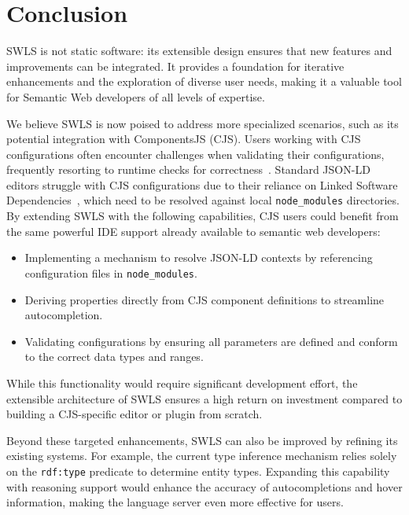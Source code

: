 \section{Conclusion}%
\label{sec:conclusion}

SWLS is not static software: its extensible design ensures that new features and improvements can be integrated.
It provides a foundation for iterative enhancements and the exploration of diverse user needs, making it a valuable tool for Semantic Web developers of all levels of expertise.

We believe SWLS is now poised to address more specialized scenarios, such as its potential integration with ComponentsJS (CJS).
Users working with CJS configurations often encounter challenges when validating their configurations, frequently resorting to runtime checks for correctness~\cite{01GPAWNQ5ZS2DAY0J9JMPQHM9C}.
Standard JSON-LD editors struggle with CJS configurations due to their reliance on Linked Software Dependencies~\cite{CJS2}, which need to be resolved against local \texttt{node\_modules} directories.
By extending SWLS with the following capabilities, CJS users could benefit from the same powerful IDE support already available to semantic web developers:

\begin{itemize}
    \item Implementing a mechanism to resolve JSON-LD contexts by referencing configuration files in \texttt{node\_modules}.
    \item Deriving properties directly from CJS component definitions to streamline autocompletion.
    \item Validating configurations by ensuring all parameters are defined and conform to the correct data types and ranges.
\end{itemize}

While this functionality would require significant development effort, 
the extensible architecture of SWLS ensures a high return on investment compared to building a CJS-specific editor or plugin from scratch.

Beyond these targeted enhancements, SWLS can also be improved by refining its existing systems.
For example, the current type inference mechanism relies solely on the \texttt{rdf:type} predicate to determine entity types.
Expanding this capability with reasoning support would enhance the accuracy of autocompletions and hover information, making the language server even more effective for users.

